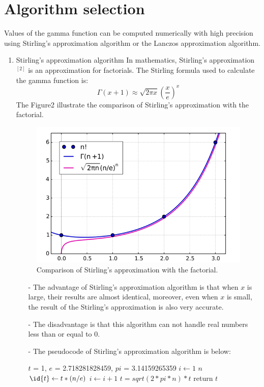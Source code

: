 \documentclass[12pt]{extarticle}
\newcommand{\<}{\langle}
\renewcommand{\>}{\rangle}
\theoremstyle{definition}
\begin{document}
\section {Algorithm selection}
\indent
Values of the gamma function can be computed numerically with high precision using Stirling's approximation algorithm or the Lanczos approximation algorithm. 
\begin{enumerate}[\text{3.}1]
\item Stirling's approximation algorithm
\newline
In mathematics, Stirling's approximation$^{[2]}$ is an approximation for factorials. The Stirling formula used to calculate the gamma function is:$$\Gamma \left( x+1 \right)\approx \sqrt{2\pi x}(\frac{x}{e})^{x}$$
The Figure2 illustrate the comparison of Stirling's approximation with the factorial.
\begin{figure}[ht]
\centering
\includegraphics[scale=0.3]{figure2.png}
\caption{ \small Comparison of Stirling's approximation with the factorial.}
\end{figure}
\newline
\begin{enumerate}
\item[-]The advantage of Stirling's approximation algorithm is that when $x$ is large, their results are almost identical, moreover, even when $x$ is small, the result of the Stirling's approximation is also very accurate.
\newline
\item[-]The disadvantage is that this algorithm can not handle real numbers less than or equal to 0. 
\item[-]The pseudocode of Stirling's approximation algorithm is below:
\begin{codebox}
\li $t$ = 1, $e$ = 2.718281828459, $pi$ = 3.14159265359
\li \For $i \gets 1$ \To $n$
\li     \Do
            $\id{t} \gets t*(n/e)$
\li         $i \gets i + 1$
        \End
\li $t = sqrt(2*pi*n)*t$
\li return $t$
\end{codebox}


\end{enumerate}
\end{enumerate}
\end{document}
